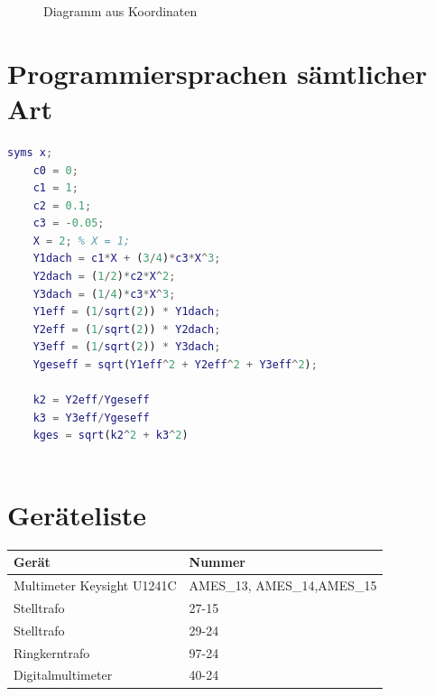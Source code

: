\resetlaborsectioncounter
{}
\begin{figure}[H]
	\centering
	\caption{Diagramm aus Koordinaten}
	\label{fig:2_2_diagramm}
\end{figure}


\newpage
\section{Programmiersprachen sämtlicher Art}
\begin{lstlisting}[language=matlab]
	syms x;
	c0 = 0;
	c1 = 1;
	c2 = 0.1;
	c3 = -0.05;
	X = 2; % X = 1;
	Y1dach = c1*X + (3/4)*c3*X^3;
	Y2dach = (1/2)*c2*X^2;
	Y3dach = (1/4)*c3*X^3;
	Y1eff = (1/sqrt(2)) * Y1dach;
	Y2eff = (1/sqrt(2)) * Y2dach;
	Y3eff = (1/sqrt(2)) * Y3dach;
	Ygeseff = sqrt(Y1eff^2 + Y2eff^2 + Y3eff^2);
	
	k2 = Y2eff/Ygeseff
	k3 = Y3eff/Ygeseff
	kges = sqrt(k2^2 + k3^2)
	
\end{lstlisting}








\newpage
\section*{Geräteliste}
\begin{table} [H]
	\begin{tabular}{|l|l|}
		\hline
		\textbf{Gerät }            & \textbf{Nummer }            \\ \hline
		Multimeter Keysight U1241C & AMES\_13, AMES\_14,AMES\_15 \\ \hline
		Stelltrafo                 & 27-15                       \\ \hline
		Stelltrafo                 & 29-24                       \\ \hline
		Ringkerntrafo              & 97-24                       \\ \hline
		Digitalmultimeter          & 40-24                       \\ \hline
	\end{tabular}
\end{table}



